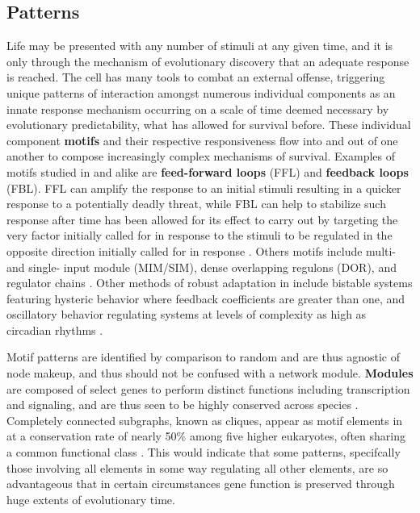 \subsection{Patterns}
\label{sec:pat}
Life may be presented with any number of stimuli at any given time, and it is only through the mechanism of evolutionary discovery that an adequate response is reached. The cell has many tools to combat an external offense, triggering unique patterns of interaction amongst numerous individual components as an innate response mechanism occurring on a scale of time deemed necessary by evolutionary predictability, \ie what has allowed for survival before. These individual component \textbf{motifs} and their respective responsiveness flow into and out of one another to compose increasingly complex mechanisms of survival. Examples of motifs studied in \coli  and \yeast alike are \textbf{feed-forward loops} (FFL) and \textbf{feedback loops} (FBL).  FFL can amplify the response to an initial stimuli resulting in a quicker response to a potentially deadly threat, while FBL can help to stabilize such response after time has been allowed for its effect to carry out by targeting the very factor initially called for in response to the stimuli to be regulated in the opposite direction initially called for in response \citep{milo2002network,mangan2003structure}. Others motifs include multi- and single- input module (MIM/SIM), dense overlapping regulons (DOR), and regulator chains \citep{kalir2005coherent,lee2002transcriptional,wang2010process}. Other methods of robust adaptation in  \coli include bistable systems featuring hysteric behavior where feedback coefficients are greater than one, and oscillatory behavior regulating systems at levels of complexity as high as circadian rhythms \citep{szallasi2006system}.

Motif patterns are identified by comparison to random and are thus agnostic of node makeup, and thus should not be confused with a network module. \textbf{Modules} are composed of select genes \eg to perform distinct functions including transcription and signaling, and are thus seen to be highly conserved across species \citep{alon2007network}. Completely connected subgraphs, known as cliques, appear as motif elements in \yeast at a conservation rate of nearly 50\% among five higher eukaryotes, often sharing a common functional class \citep{wuchty2003evolutionary}. This would indicate that some patterns, specifcally those involving all elements in some way regulating all other elements, are so advantageous that in certain circumstances gene function is preserved through huge extents of evolutionary time.

